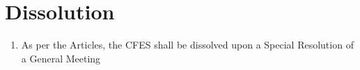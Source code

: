 \section{Dissolution}
\label{dissolution}

\begin{enumerate}
 \item As per the Articles, the CFES shall be dissolved upon a Special Resolution of a General Meeting
\end{enumerate}
